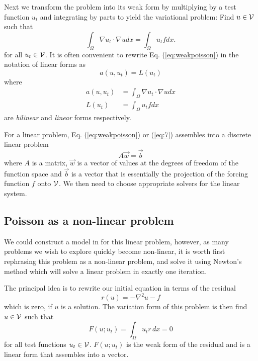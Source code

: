 \documentclass[10pt,twoside,openright]{memoir}
\begin{document}
Next we transform the problem into its weak form by multiplying by a
test function $u_{t}$ and integrating by parts to yield the
variational problem: Find $u\in \mathcal{V}$ such that
\begin{equation}
\int_\Omega \nabla u_t\cdot \nabla u dx= \int_\Omega u_t f dx.\label{eq:weakpoisson}
\end{equation}
for all $u_{t} \in\mathcal{V}$. It is often convenient to rewrite
Eq. (\ref{eq:weakpoisson}) in the notation of linear forms as
\begin{equation}
\label{eq:7}
  a(u,u_{t}) = L(u_{t})
\end{equation}
where
\begin{align}
  \label{eq:5}
  a(u,u_{t}) &= \int_\Omega \nabla u_t\cdot \nabla u dx\\
  L(u_{t})    &=  \int_\Omega u_t f dx
\end{align}
are \emph{bilinear} and \emph{linear} forms respectively.

For a linear problem, Eq. (\ref{eq:weakpoisson}) or (\ref{eq:7}) assembles into a discrete linear problem
\begin{equation}
  \label{eq:1}
  A\vec{w} = \vec{b}
\end{equation}
where $A$ is a matrix, $\vec{w}$ is a vector of values at the degrees of freedom of the
function space and $\vec{b}$ is a vector that is essentially the
projection of the forcing function $f$ onto $\mathcal{V}$.  We then need
to choose appropriate solvers for the linear system.

\subsection{Poisson as a non-linear problem}
\label{sec:poisson-as-non}

We could construct a model in \TF{} for this linear problem, however, as many
problems we wish to explore  quickly become non-linear, it is worth
first rephrasing this problem as a non-linear problem, and solve it
using Newton's method which will solve a linear problem in
exactly one iteration. %

The principal idea is to rewrite our initial equation in terms of the residual
\begin{equation}
  \label{eq:2}
  r(u) = -\nabla^2 u - f
\end{equation}
which is zero, if $u$ is a solution.  The variation form of this
problem  is then find $u\in\mathcal{V}$ such that
\begin{equation}
  \label{eq:3}
  F(u;u_{t}) = \int_{\Omega} u_{t}r\, dx = 0
\end{equation}
for all test functions $u_t\in\mathcal{V}$.  $F(u;u_{t})$ is the weak
form of the residual and is a linear form that assembles into a
vector.
\end{document}
